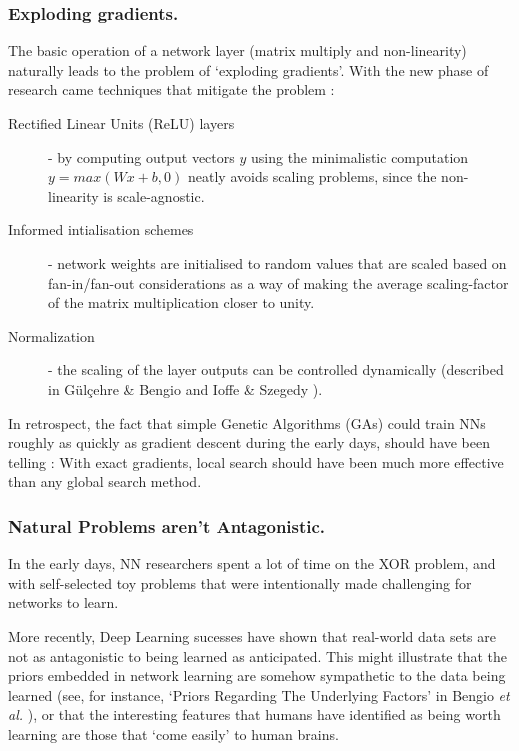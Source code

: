 \documentclass[citeauthoryear]{llncs}
\begin{document}
\subsubsection*{Exploding gradients.}

The basic operation of a network layer (matrix multiply and non-linearity) 
naturally leads to the problem of `exploding gradients'.
With the new phase of research came techniques that mitigate the problem : 

\begin{description}

\item[Rectified Linear Units (ReLU) layers] - by computing output vectors $y$ 
using the minimalistic computation $y=max(Wx+b, 0)$ neatly avoids 
scaling problems, since the non-linearity is scale-agnostic.

\item[Informed intialisation schemes] - network weights are initialised 
to random values that are scaled based on fan-in/fan-out considerations as a way of making the 
average scaling-factor of the matrix multiplication closer to unity.

\item[Normalization] - the scaling of the layer outputs can be controlled
dynamically (described in G{\"u}l{\c{c}}ehre \& Bengio \cite{bengio-whitening} and 
Ioffe \& Szegedy \cite{WhiteningOfData}).

\end{description}

In retrospect, the fact that simple Genetic Algorithms (GAs) could train 
NNs roughly as quickly as gradient descent during the early days, 
should have been telling : With exact gradients, local search should have 
been much more effective than any global search method.


\subsubsection*{Natural Problems aren't Antagonistic.}

In the early days, NN researchers spent a lot of time on the 
XOR problem, and with self-selected toy problems that were 
intentionally made challenging for networks to learn.

More recently, Deep Learning sucesses have shown that real-world data sets 
are not as antagonistic to being learned as anticipated.  
This might illustrate that the priors embedded in network learning are 
somehow sympathetic to the data being learned 
(see, for instance, `Priors Regarding The Underlying Factors' in Bengio \emph{et al.} \cite{Bengio-et-al-2014-Book}),
or that the interesting features that humans have identified as being 
worth learning are those that `come easily' to human brains.
\end{document}
